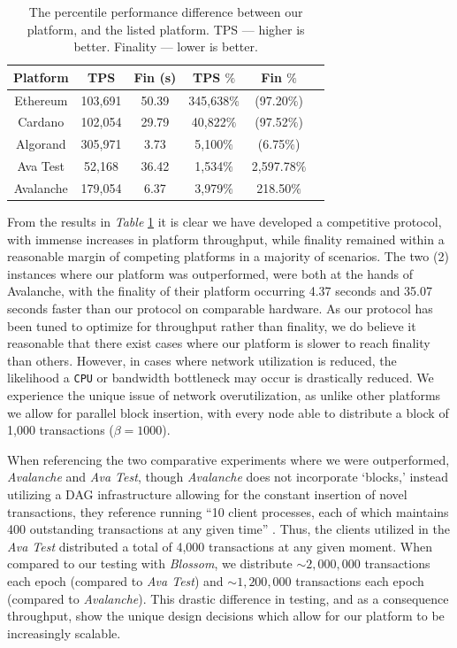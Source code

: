 \begin{table}[h!]
\centering

    \begin{tabular}{cccccc}
     \hline
     \textbf{Platform}& TPS & Fin (s) &TPS $\%$ &Fin $\%$\\
     \hline
     Ethereum &103,691 &50.39 &345,638$\%$ &(97.20$\%$)\\
     Cardano &102,054 &29.79 &40,822$\%$ &(97.52$\%$)\\
     Algorand &305,971 &3.73 &5,100$\%$ &(6.75$\%$)\\
     Ava Test &52,168 &36.42 &1,534$\%$ &2,597.78$\%$\\
     Avalanche &179,054 &6.37 &3,979$\%$ &218.50$\%$\\
     \hline
    \end{tabular}
    \caption{The percentile performance difference between our platform, and the listed platform. TPS  — higher is better. Finality — lower is better.}
    \label{tab:tab3}
\end{table}

From the results in \textit{Table} \ref{tab:tab3} it is clear we have developed a competitive protocol, with immense increases in platform throughput, while finality remained within a reasonable margin of competing platforms in a majority of scenarios. The two (2) instances where our platform was outperformed, were both at the hands of Avalanche, with the finality of their platform occurring 4.37 seconds and 35.07 seconds faster than our protocol on comparable hardware. As our protocol has been tuned to optimize for throughput rather than finality, we do believe it reasonable that there exist cases where our platform is slower to reach finality than others. However, in cases where network utilization is reduced, the likelihood a \texttt{CPU} or bandwidth bottleneck may occur is drastically reduced. We experience the unique issue of network overutilization, as unlike other platforms we allow for parallel block insertion, with every node able to distribute a block of 1,000 transactions (\(\beta = 1000\)).

When referencing the two comparative experiments where we were outperformed, \textit{Avalanche} and \textit{Ava Test}, though \textit{Avalanche} does not incorporate ‘blocks,’ instead utilizing a DAG infrastructure allowing for the constant insertion of novel transactions, they reference running “10 client processes, each of which maintains 400 outstanding transactions at any given time” \cite{sekniqi2020avalanche}. Thus, the clients utilized in the \textit{Ava Test} distributed a total of 4,000 transactions at any given moment. When compared to our testing with \textit{Blossom}, we distribute \(\sim 2,000,000\) transactions each epoch (compared to \textit{Ava Test}) and \(\sim 1,200,000\) transactions each epoch (compared to \textit{Avalanche}). This drastic difference in testing, and as a consequence throughput, show the unique design decisions which allow for our platform to be increasingly scalable.

